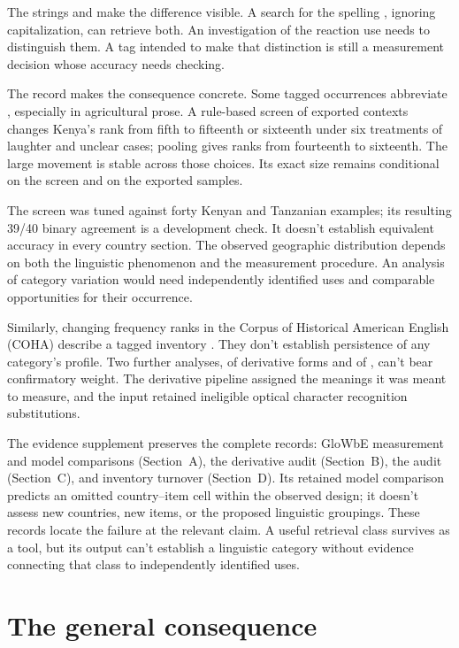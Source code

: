 \documentclass[12pt]{article}
\begin{document}
The strings  and  make the difference visible. A search for the spelling
, ignoring capitalization, can retrieve both. An investigation
of the reaction use needs to distinguish them. A tag intended to
make that distinction is still a measurement decision whose accuracy
needs checking.

The  record makes the consequence concrete. Some tagged
occurrences abbreviate , especially in agricultural prose.
A rule-based screen of exported contexts changes Kenya's rank from fifth
to fifteenth or sixteenth under six treatments of laughter and unclear
cases; pooling gives ranks from fourteenth to sixteenth. The large
movement is stable across those choices. Its exact size remains
conditional on the screen and on the exported samples.

The screen was tuned against forty Kenyan and Tanzanian examples;
its resulting 39/40 binary agreement is a development check. It doesn't
establish equivalent accuracy in every country section. The observed
geographic distribution depends on both the linguistic
phenomenon and the measurement procedure. An analysis of category
variation would need independently identified uses and comparable
opportunities for their occurrence.

Similarly, changing frequency ranks in the Corpus of Historical American
English (COHA) describe a tagged inventory \citep{davies2010}.
They don't establish persistence of any category's profile.
Two further analyses, of derivative forms and of , can't bear
confirmatory weight. The derivative pipeline assigned the meanings it was
meant to measure, and the  input retained ineligible optical
character recognition substitutions.

The evidence supplement preserves the complete records: GloWbE measurement and model comparisons
(Section~A), the derivative audit (Section~B), the  audit
(Section~C), and inventory turnover (Section~D). Its retained model
comparison predicts an omitted country--item cell within the observed
design; it doesn't assess new countries, new items, or the proposed
linguistic groupings. These records locate
the failure at the relevant claim. A useful retrieval class survives
as a tool, but its output can't establish a linguistic category
without evidence connecting that class to independently identified uses.

\section{The general consequence}\label{sec:discussion}
\end{document}
